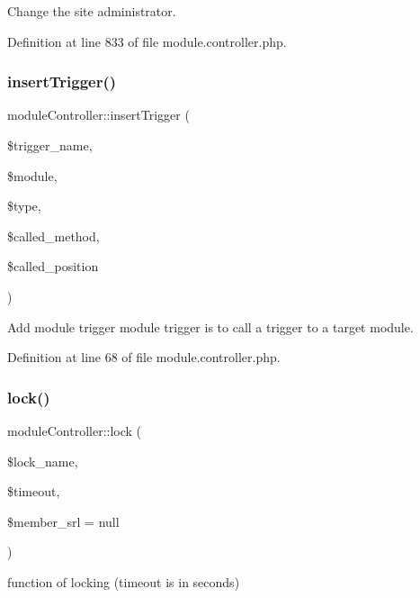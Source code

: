 Change the site administrator. 



Definition at line 833 of file module.\+controller.\+php.

\mbox{\label{classmoduleController_ad4fb0e3cfddb064ffcc9d71f983066a9}} 
\subsubsection{\texorpdfstring{insert\+Trigger()}{insertTrigger()}}
{\footnotesize\ttfamily module\+Controller\+::insert\+Trigger (\begin{DoxyParamCaption}\item[{}]{\$trigger\+\_\+name,  }\item[{}]{\$module,  }\item[{}]{\$type,  }\item[{}]{\$called\+\_\+method,  }\item[{}]{\$called\+\_\+position }\end{DoxyParamCaption})}



Add module trigger module trigger is to call a trigger to a target module. 



Definition at line 68 of file module.\+controller.\+php.

\mbox{\label{classmoduleController_a1395c1be0ebed50078212640fba409be}} 
\subsubsection{\texorpdfstring{lock()}{lock()}}
{\footnotesize\ttfamily module\+Controller\+::lock (\begin{DoxyParamCaption}\item[{}]{\$lock\+\_\+name,  }\item[{}]{\$timeout,  }\item[{}]{\$member\+\_\+srl = {\ttfamily null} }\end{DoxyParamCaption})}



function of locking (timeout is in seconds) 



